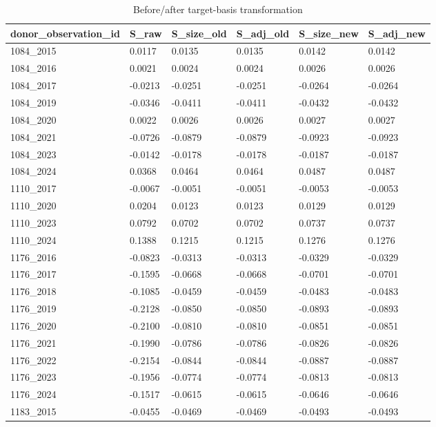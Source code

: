 \begin{table}[htbp]
\centering
\caption{Before/after target-basis transformation}
\label{tab:v2_ptd}
\begin{tabular}{llllll}
\toprule
\textbf{donor_observation_id} & \textbf{S_raw} & \textbf{S_size_old} & \textbf{S_adj_old} & \textbf{S_size_new} & \textbf{S_adj_new} \\
\midrule
1084_2015 & 0.0117 & 0.0135 & 0.0135 & 0.0142 & 0.0142 \\
1084_2016 & 0.0021 & 0.0024 & 0.0024 & 0.0026 & 0.0026 \\
1084_2017 & -0.0213 & -0.0251 & -0.0251 & -0.0264 & -0.0264 \\
1084_2019 & -0.0346 & -0.0411 & -0.0411 & -0.0432 & -0.0432 \\
1084_2020 & 0.0022 & 0.0026 & 0.0026 & 0.0027 & 0.0027 \\
1084_2021 & -0.0726 & -0.0879 & -0.0879 & -0.0923 & -0.0923 \\
1084_2023 & -0.0142 & -0.0178 & -0.0178 & -0.0187 & -0.0187 \\
1084_2024 & 0.0368 & 0.0464 & 0.0464 & 0.0487 & 0.0487 \\
1110_2017 & -0.0067 & -0.0051 & -0.0051 & -0.0053 & -0.0053 \\
1110_2020 & 0.0204 & 0.0123 & 0.0123 & 0.0129 & 0.0129 \\
1110_2023 & 0.0792 & 0.0702 & 0.0702 & 0.0737 & 0.0737 \\
1110_2024 & 0.1388 & 0.1215 & 0.1215 & 0.1276 & 0.1276 \\
1176_2016 & -0.0823 & -0.0313 & -0.0313 & -0.0329 & -0.0329 \\
1176_2017 & -0.1595 & -0.0668 & -0.0668 & -0.0701 & -0.0701 \\
1176_2018 & -0.1085 & -0.0459 & -0.0459 & -0.0483 & -0.0483 \\
1176_2019 & -0.2128 & -0.0850 & -0.0850 & -0.0893 & -0.0893 \\
1176_2020 & -0.2100 & -0.0810 & -0.0810 & -0.0851 & -0.0851 \\
1176_2021 & -0.1990 & -0.0786 & -0.0786 & -0.0826 & -0.0826 \\
1176_2022 & -0.2154 & -0.0844 & -0.0844 & -0.0887 & -0.0887 \\
1176_2023 & -0.1956 & -0.0774 & -0.0774 & -0.0813 & -0.0813 \\
1176_2024 & -0.1517 & -0.0615 & -0.0615 & -0.0646 & -0.0646 \\
1183_2015 & -0.0455 & -0.0469 & -0.0469 & -0.0493 & -0.0493 \\

\end{tabular}
\end{table}
